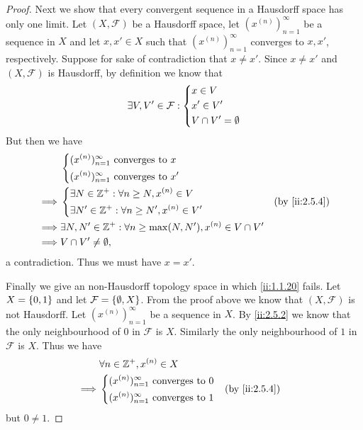 \begin{proof}
  Next we show that every convergent sequence in a Hausdorff space has only one limit.
  Let \((X, \mathcal{F})\) be a Hausdorff space, let \((x^{(n)})_{n = 1}^\infty\) be a sequence in \(X\) and let \(x, x' \in X\) such that \((x^{(n)})_{n = 1}^\infty\) converges to \(x, x'\), respectively.
  Suppose for sake of contradiction that \(x \neq x'\).
  Since \(x \neq x'\) and \((X, \mathcal{F})\) is Hausdorff, by definition we know that
  \[
    \exists V, V' \in \mathcal{F} : \begin{dcases}
      x \in V   \\
      x' \in V' \\
      V \cap V' = \emptyset
    \end{dcases}
  \]
  But then we have
  \begin{align*}
             & \begin{dcases}
                 (x^{(n)})_{n = 1}^\infty \text{ converges to } x \\
                 (x^{(n)})_{n = 1}^\infty \text{ converges to } x'
               \end{dcases}                           \\
    \implies & \begin{dcases}
                 \exists N \in \Z^+ : \forall n \geq N, x^{(n)} \in V \\
                 \exists N' \in \Z^+ : \forall n \geq N', x^{(n)} \in V'
               \end{dcases}                    &  & \by{ii:2.5.4}                     \\
    \implies & \exists N, N' \in \Z^+ : \forall n \geq \max(N, N'), x^{(n)} \in V \cap V' \\
    \implies & V \cap V' \neq \emptyset,
  \end{align*}
  a contradiction.
  Thus we must have \(x = x'\).

  Finally we give an non-Hausdorff topology space in which \cref{ii:1.1.20} fails.
  Let \(X = \left\lbrace0, 1\right\rbrace\) and let \(\mathcal{F} = \left\lbrace\emptyset, X\right\rbrace\).
  From the proof above we know that \((X, \mathcal{F})\) is not Hausdorff.
  Let \((x^{(n)})_{n = 1}^\infty\) be a sequence in \(X\).
  By \cref{ii:2.5.2} we know that the only neighbourhood of \(0\) in \(\mathcal{F}\) is \(X\).
  Similarly the only neighbourhood of \(1\) in \(\mathcal{F}\) is \(X\).
  Thus we have
  \begin{align*}
             & \forall n \in \Z^+, x^{(n)} \in X                \\
    \implies & \begin{dcases}
                 (x^{(n)})_{n = 1}^\infty \text{ converges to } 0 \\
                 (x^{(n)})_{n = 1}^\infty \text{ converges to } 1
               \end{dcases} &  & \by{ii:2.5.4}
  \end{align*}
  but \(0 \neq 1\).
\end{proof}

